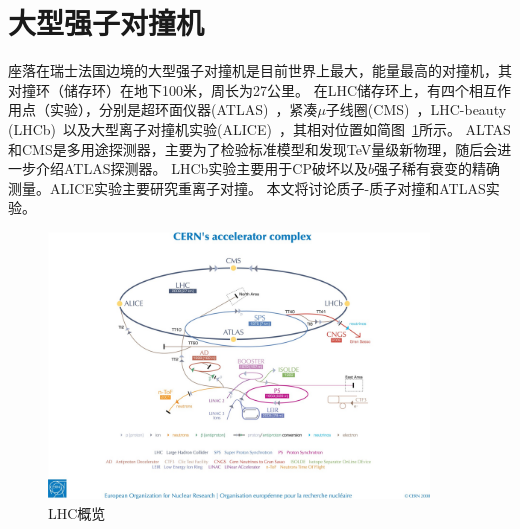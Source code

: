 \section{大型强子对撞机} \label{sec:LHC}
座落在瑞士法国边境的大型强子对撞机是目前世界上最大，能量最高的对撞机，其对撞环（储存环）在地下100米，周长为27公里。
在LHC储存环上，有四个相互作用点（实验），分别是超环面仪器(ATLAS)~\cite{ATLAS_Collaboration_2008}，紧凑$\mu$子线圈(CMS)~\cite{CMS_Collaboration_2008}，LHC-beauty (LHCb)~\cite{LHCb_Collaboration_2008}以及大型离子对撞机实验(ALICE)~\cite{ALICE_Collaboration_2008}，其相对位置如简图~\ref{fig:LHC_schematic}所示。
ALTAS和CMS是多用途探测器，主要为了检验标准模型和发现TeV量级新物理，随后会进一步介绍ATLAS探测器。
LHCb实验主要用于CP破坏以及$b$强子稀有衰变的精确测量。ALICE实验主要研究重离子对撞。
本文将讨论质子-质子对撞和ATLAS实验。
\begin{figure}[h]
\begin{center}
\includegraphics[width = 0.9\textwidth,angle=-90]{fig/LHC-shematic.jpg}
\caption{LHC概览} \label{fig:LHC_schematic}
\end{center}
\end{figure}

